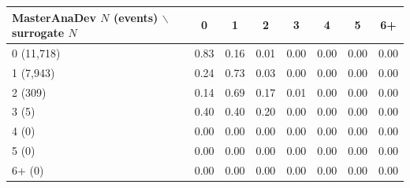 \begin{tabular}{lccccccc}
\toprule
MasterAnaDev $N$ (events) $\backslash$ surrogate $N$ & 0 & 1 & 2 & 3 & 4 & 5 & 6+ \\
\midrule
0 (11,718) & 0.83 & 0.16 & 0.01 & 0.00 & 0.00 & 0.00 & 0.00 \\
1 (7,943) & 0.24 & 0.73 & 0.03 & 0.00 & 0.00 & 0.00 & 0.00 \\
2 (309) & 0.14 & 0.69 & 0.17 & 0.01 & 0.00 & 0.00 & 0.00 \\
3 (5) & 0.40 & 0.40 & 0.20 & 0.00 & 0.00 & 0.00 & 0.00 \\
4 (0) & 0.00 & 0.00 & 0.00 & 0.00 & 0.00 & 0.00 & 0.00 \\
5 (0) & 0.00 & 0.00 & 0.00 & 0.00 & 0.00 & 0.00 & 0.00 \\
6+ (0) & 0.00 & 0.00 & 0.00 & 0.00 & 0.00 & 0.00 & 0.00 \\
\bottomrule
\end{tabular}
